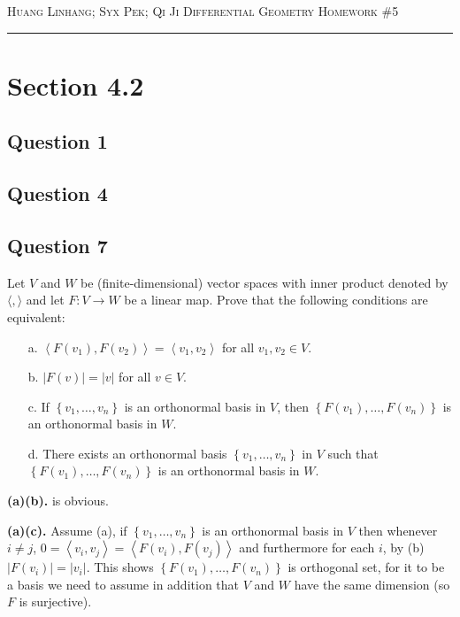 \documentclass[12pt]{article}
\begin{document}
\thispagestyle{empty}

{\scshape Huang Linhang; Syx Pek; Qi Ji} \hfill {\scshape \large Differential Geometry} \hfill {\scshape Homework \#5}

\smallskip
\hrule
\bigskip
\section{Section 4.2}

\subsection*{Question 1}



\subsection*{Question 4}



\subsection*{Question 7}

\newcommand*{\inner}[1]{\left\langle #1 \right\rangle}
\newcommand*{\set}[1]{\left\{ #1 \right\}}
\newcommand*{\abs}[1]{\left\lvert #1 \right\rvert}

Let \(V\) and \(W\) be (finite-dimensional) vector spaces with inner product denoted by \(\langle,\rangle\)
and let \(F:V\to W\) be a linear map.
Prove that the following conditions are equivalent:
\begin{enumerate}
    \item[a.] \(\inner{F(v_1),F(v_2) } = \inner{v_1,v_2}\) for all \(v_1,v_2\in V\).
    \item[b.] \(\abs{ F(v) } = \abs{ v}\) for all \(v\in V\).
    \item[c.] If \(\set{v_1,\dots,v_n}\) is an orthonormal basis in \(V\), then \(\set{F(v_1),\dots,F(v_n)}\) is an orthonormal basis in \(W\).
    \item[d.] There exists an orthonormal basis \(\set{v_1,\dots,v_n}\) in \(V\) such that \(\set{F(v_1),\dots,F(v_n)}\) is an orthonormal basis in \(W\).
\end{enumerate}

\textbf{(a)\Rightarrow(b).} is obvious.

\textbf{(a)\Rightarrow(c).} Assume (a), if \(\set{v_1,\dots,v_n}\) is an orthonormal basis in \(V\) then whenever \(i\ne j\),
\(0 = \inner{v_i,v_j} = \inner{F(v_i),F(v_j)}\) and furthermore for each \(i\), by (b) \(\abs{F(v_i)} = \abs{v_i}\).
This shows \(\set{F(v_1),\dots,F(v_n)}\) is orthogonal set, for it to be a basis we need to assume in addition that \(V\) and \(W\) have the same dimension (so \(F\) is surjective).
\end{document}
